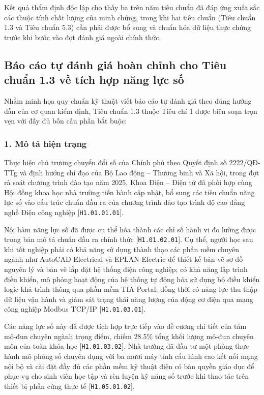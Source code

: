 Kết quả thẩm định độc lập cho thấy ba trên năm tiêu chuẩn đã đáp ứng xuất sắc các thuộc tính chất lượng của minh chứng, trong khi hai tiêu chuẩn (Tiêu chuẩn 1.3 và Tiêu chuẩn 5.3) cần phải được bổ sung và chuẩn hóa dữ liệu thực chứng trước khi bước vào đợt đánh giá ngoài chính thức.

\subsection{Báo cáo tự đánh giá hoàn chỉnh cho Tiêu chuẩn 1.3 về tích hợp năng lực số}

Nhằm minh họa quy chuẩn kỹ thuật viết báo cáo tự đánh giá theo đúng hướng dẫn của cơ quan kiểm định, Tiêu chuẩn 1.3 thuộc Tiêu chí 1 được biên soạn trọn vẹn với đầy đủ bốn cấu phần bắt buộc:

\subsubsection*{1. Mô tả hiện trạng}
Thực hiện chủ trương chuyển đổi số của Chính phủ theo Quyết định số 2222/QĐ-TTg \parencite{qd2222} và định hướng chỉ đạo của Bộ Lao động -- Thương binh và Xã hội, trong đợt rà soát chương trình đào tạo năm 2025, Khoa Điện -- Điện tử đã phối hợp cùng Hội đồng khoa học nhà trường tiến hành cập nhật, bổ sung các tiêu chuẩn năng lực số vào cấu trúc chuẩn đầu ra của chương trình đào tạo trình độ cao đẳng nghề Điện công nghiệp [\texttt{H1.01.01.01}].

Nội hàm năng lực số đã được cụ thể hóa thành các chỉ số hành vi đo lường được trong bản mô tả chuẩn đầu ra chính thức [\texttt{H1.01.02.01}]. Cụ thể, người học sau khi tốt nghiệp phải có khả năng sử dụng thành thạo các phần mềm chuyên ngành như AutoCAD Electrical và EPLAN Electric để thiết kế bản vẽ sơ đồ nguyên lý và bản vẽ lắp đặt hệ thống điện công nghiệp; có khả năng lập trình điều khiển, mô phỏng hoạt động của hệ thống tự động hóa sử dụng bộ điều khiển logic khả trình thông qua phần mềm TIA Portal; đồng thời có năng lực thu thập dữ liệu vận hành và giám sát trạng thái năng lượng của động cơ điện qua mạng công nghiệp Modbus TCP/IP [\texttt{H1.01.03.01}].

Các năng lực số này đã được tích hợp trực tiếp vào đề cương chi tiết của tám mô-đun chuyên ngành trọng điểm, chiếm 28.5\% tổng khối lượng mô-đun chuyên môn của toàn khóa học [\texttt{H1.01.03.02}]. Nhà trường đã đầu tư một phòng thực hành mô phỏng số chuyên dụng với ba mươi máy tính cấu hình cao kết nối mạng nội bộ và cài đặt đầy đủ các phần mềm kỹ thuật điện có bản quyền giáo dục để phục vụ cho sinh viên học tập và rèn luyện kỹ năng số trước khi thao tác trên thiết bị phần cứng thực tế [\texttt{H1.05.01.02}].

